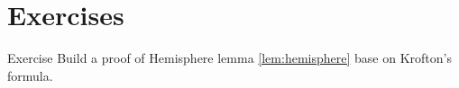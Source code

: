 

\section{Exercises}

\begin{thm}{Exercise}
Build a proof of Hemisphere lemma
\ref{lem:hemisphere} base on Krofton's formula.
\end{thm}






